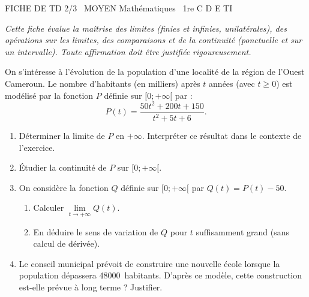 \documentclass[11pt]{article}
\begin{document}
\begin{tcolorbox}[enhanced,colback=popink,colframe=popink,arc=10pt,boxrule=0pt,left=12pt,right=12pt,top=9pt,bottom=9pt]
{\color{white}\popxbold\small FICHE DE TD 2/3 \textbullet\ MOYEN \hfill Mathématiques \textbullet\ 1re C D E TI\par}
\end{tcolorbox}
\vspace{4pt}
\emph{Cette fiche évalue la maîtrise des limites (finies et infinies, unilatérales), des opérations sur les limites, des comparaisons et de la continuité (ponctuelle et sur un intervalle). Toute affirmation doit être justifiée rigoureusement.}

\begin{exercice}
On s'intéresse à l'évolution de la population d'une localité de la région de l'Ouest Cameroun. Le nombre d'habitants (en milliers) après $t$ années (avec $t \geq 0$) est modélisé par la fonction $P$ définie sur $[0 ; +\infty[$ par :
\[
P(t) = \frac{50t^2 + 200t + 150}{t^2 + 5t + 6}.
\]
\begin{enumerate}
    \item Déterminer la limite de $P$ en $+\infty$. Interpréter ce résultat dans le contexte de l'exercice.
    \item Étudier la continuité de $P$ sur $[0 ; +\infty[$. 
    \item On considère la fonction $Q$ définie sur $[0 ; +\infty[$ par $Q(t) = P(t) - 50$. 
    \begin{enumerate}
        \item Calculer $\lim\limits_{t \to +\infty} Q(t)$.
        \item En déduire le sens de variation de $Q$ pour $t$ suffisamment grand (sans calcul de dérivée).
    \end{enumerate}
    \item Le conseil municipal prévoit de construire une nouvelle école lorsque la population dépassera \SI{48000}{habitants}. D'après ce modèle, cette construction est-elle prévue à long terme ? Justifier.
\end{enumerate}
\end{exercice}
\end{document}
